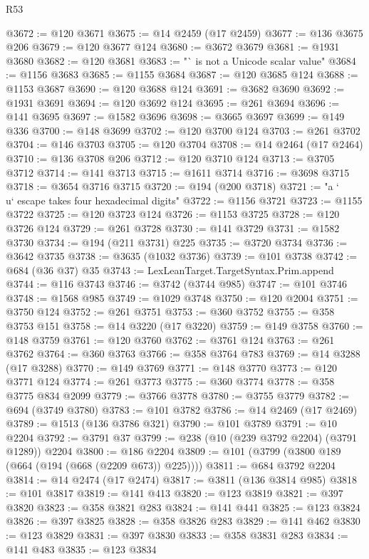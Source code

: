 \begin{lexlean}{R53}
\begin{coremodule}
@3672 := @120 @3671
@3675 := @14 @2459 (@17 @2459)
@3677 := @136 @3675 @206
@3679 := @120 @3677 @124
@3680 := @3672 @3679
@3681 := @1931 @3680
@3682 := @120 @3681
@3683 := "` is not a Unicode scalar value"
@3684 := @1156 @3683
@3685 := @1155 @3684
@3687 := @120 @3685 @124
@3688 := @1153 @3687
@3690 := @120 @3688 @124
@3691 := @3682 @3690
@3692 := @1931 @3691
@3694 := @120 @3692 @124
@3695 := @261 @3694
@3696 := @141 @3695
@3697 := @1582 @3696
@3698 := @3665 @3697
@3699 := @149 @336
@3700 := @148 @3699
@3702 := @120 @3700 @124
@3703 := @261 @3702
@3704 := @146 @3703
@3705 := @120 @3704
@3708 := @14 @2464 (@17 @2464)
@3710 := @136 @3708 @206
@3712 := @120 @3710 @124
@3713 := @3705 @3712
@3714 := @141 @3713
@3715 := @1611 @3714
@3716 := @3698 @3715
@3718 := @3654 @3716 @3715
@3720 := @194 (@200 @3718)
@3721 := "a `\\u` escape takes four hexadecimal digits"
@3722 := @1156 @3721
@3723 := @1155 @3722
@3725 := @120 @3723 @124
@3726 := @1153 @3725
@3728 := @120 @3726 @124
@3729 := @261 @3728
@3730 := @141 @3729
@3731 := @1582 @3730
@3734 := @194 (@211 @3731) @225
@3735 := @3720 @3734
@3736 := @3642 @3735
@3738 := @3635 (@1032 @3736)
@3739 := @101 @3738
@3742 := @684 (@36 @37) @35
@3743 := LexLeanTarget.TargetSyntax.Prim.append
@3744 := @116 @3743
@3746 := @3742 (@3744 @985)
@3747 := @101 @3746
@3748 := @1568 @985
@3749 := @1029 @3748
@3750 := @120 @2004
@3751 := @3750 @124
@3752 := @261 @3751
@3753 := @360 @3752
@3755 := @358 @3753 @151
@3758 := @14 @3220 (@17 @3220)
@3759 := @149 @3758
@3760 := @148 @3759
@3761 := @120 @3760
@3762 := @3761 @124
@3763 := @261 @3762
@3764 := @360 @3763
@3766 := @358 @3764 @783
@3769 := @14 @3288 (@17 @3288)
@3770 := @149 @3769
@3771 := @148 @3770
@3773 := @120 @3771 @124
@3774 := @261 @3773
@3775 := @360 @3774
@3778 := @358 @3775 @834 @2099
@3779 := @3766 @3778
@3780 := @3755 @3779
@3782 := @694 (@3749 @3780)
@3783 := @101 @3782
@3786 := @14 @2469 (@17 @2469)
@3789 := @1513 (@136 @3786 @321)
@3790 := @101 @3789
@3791 := @10 @2204
@3792 := @3791 @37
@3799 := @238 (@10 (@239 @3792 @2204) (@3791 @1289)) @2204
@3800 := @186 @2204
@3809 := @101 (@3799 (@3800 @189 (@664 (@194 (@668 (@2209 @673)) @225))))
@3811 := @684 @3792 @2204
@3814 := @14 @2474 (@17 @2474)
@3817 := @3811 (@136 @3814 @985)
@3818 := @101 @3817
@3819 := @141 @413
@3820 := @123 @3819
@3821 := @397 @3820
@3823 := @358 @3821 @283
@3824 := @141 @441
@3825 := @123 @3824
@3826 := @397 @3825
@3828 := @358 @3826 @283
@3829 := @141 @462
@3830 := @123 @3829
@3831 := @397 @3830
@3833 := @358 @3831 @283
@3834 := @141 @483
@3835 := @123 @3834

\end{coremodule}
\end{lexlean}
